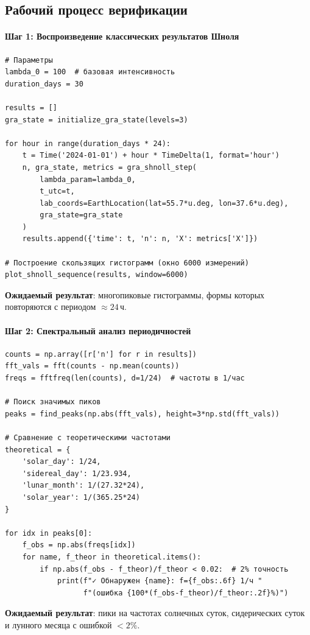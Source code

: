 \documentclass[12pt,a4paper]{article}
\theoremstyle{plain}
\theoremstyle{definition}
\theoremstyle{remark}
\begin{document}
\subsection{Рабочий процесс верификации}

\paragraph{Шаг 1: Воспроизведение классических результатов Шноля}
\begin{lstlisting}[caption={Симуляция 30-дневного эксперимента}, label={lst:reproduce-shnoll}]
# Параметры
lambda_0 = 100  # базовая интенсивность
duration_days = 30

results = []
gra_state = initialize_gra_state(levels=3)

for hour in range(duration_days * 24):
    t = Time('2024-01-01') + hour * TimeDelta(1, format='hour')
    n, gra_state, metrics = gra_shnoll_step(
        lambda_param=lambda_0,
        t_utc=t,
        lab_coords=EarthLocation(lat=55.7*u.deg, lon=37.6*u.deg),
        gra_state=gra_state
    )
    results.append({'time': t, 'n': n, 'X': metrics['X']})

# Построение скользящих гистограмм (окно 6000 измерений)
plot_shnoll_sequence(results, window=6000)
\end{lstlisting}
\textbf{Ожидаемый результат}: многопиковые гистограммы, формы которых повторяются с периодом $\approx 24$\,ч.

\paragraph{Шаг 2: Спектральный анализ периодичностей}
\begin{lstlisting}[caption={Выявление космофизических частот через БПФ}, label={lst:fft-analysis}]
counts = np.array([r['n'] for r in results])
fft_vals = fft(counts - np.mean(counts))
freqs = fftfreq(len(counts), d=1/24)  # частоты в 1/час

# Поиск значимых пиков
peaks = find_peaks(np.abs(fft_vals), height=3*np.std(fft_vals))

# Сравнение с теоретическими частотами
theoretical = {
    'solar_day': 1/24,
    'sidereal_day': 1/23.934,
    'lunar_month': 1/(27.32*24),
    'solar_year': 1/(365.25*24)
}

for idx in peaks[0]:
    f_obs = np.abs(freqs[idx])
    for name, f_theor in theoretical.items():
        if np.abs(f_obs - f_theor)/f_theor < 0.02:  # 2% точность
            print(f"✓ Обнаружен {name}: f={f_obs:.6f} 1/ч "
                  f"(ошибка {100*(f_obs-f_theor)/f_theor:.2f}%)")
\end{lstlisting}
\textbf{Ожидаемый результат}: пики на частотах солнечных суток, сидерических суток и лунного месяца с ошибкой $<2\%$.
\end{document}
